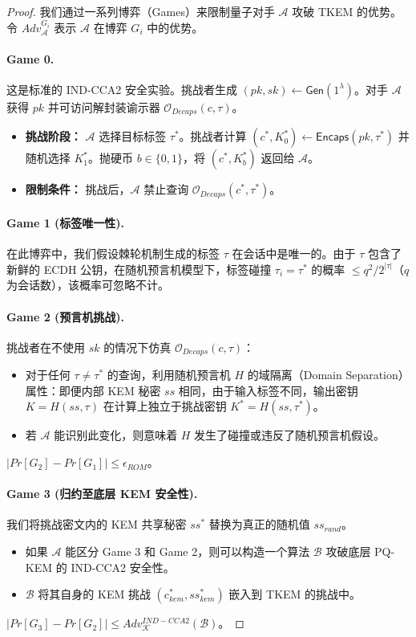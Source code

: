 \begin{proof}
我们通过一系列博弈（Games）来限制量子对手 $\mathcal{A}$ 攻破 TKEM 的优势。令 $Adv_{\mathcal{A}}^{G_i}$ 表示 $\mathcal{A}$ 在博弈 $G_i$ 中的优势。

\paragraph{Game 0.} 这是标准的 IND-CCA2 安全实验。挑战者生成 $(pk, sk) \leftarrow \mathsf{Gen}(1^\lambda)$。对手 $\mathcal{A}$ 获得 $pk$ 并可访问解封装谕示器 $\mathcal{O}_{Decaps}(c, \tau)$。
\begin{itemize}
    \item \textbf{挑战阶段：} $\mathcal{A}$ 选择目标标签 $\tau^*$。挑战者计算 $(c^*, K_0^*) \leftarrow \mathsf{Encaps}(pk, \tau^*)$ 并随机选择 $K_1^*$。抛硬币 $b \in \{0, 1\}$，将 $(c^*, K_b^*)$ 返回给 $\mathcal{A}$。
    \item \textbf{限制条件：} 挑战后，$\mathcal{A}$ 禁止查询 $\mathcal{O}_{Decaps}(c^*, \tau^*)$。
\end{itemize}



\paragraph{Game 1 (标签唯一性).} 在此博弈中，我们假设棘轮机制生成的标签 $\tau$ 在会话中是唯一的。由于 $\tau$ 包含了新鲜的 ECDH 公钥，在随机预言机模型下，标签碰撞 $\tau_i = \tau^*$ 的概率 $\leq q^2 / 2^{|\tau|}$（$q$ 为会话数），该概率可忽略不计。

\paragraph{Game 2 (预言机挑战).} 挑战者在不使用 $sk$ 的情况下仿真 $\mathcal{O}_{Decaps}(c, \tau)$：
\begin{itemize}
    \item 对于任何 $\tau \neq \tau^*$ 的查询，利用随机预言机 $H$ 的域隔离（Domain Separation）属性：即便内部 KEM 秘密 $ss$ 相同，由于输入标签不同，输出密钥 $K = H(ss, \tau)$ 在计算上独立于挑战密钥 $K^* = H(ss, \tau^*)$。
    \item 若 $\mathcal{A}$ 能识别此变化，则意味着 $H$ 发生了碰撞或违反了随机预言机假设。
\end{itemize}
$|Pr[G_2] - Pr[G_1]| \leq \epsilon_{ROM}$。

\paragraph{Game 3 (归约至底层 KEM 安全性).} 我们将挑战密文内的 KEM 共享秘密 $ss^*$ 替换为真正的随机值 $ss_{rand}$。
\begin{itemize}
    \item 如果 $\mathcal{A}$ 能区分 Game 3 和 Game 2，则可以构造一个算法 $\mathcal{B}$ 攻破底层 PQ-KEM 的 IND-CCA2 安全性。
    \item $\mathcal{B}$ 将其自身的 KEM 挑战 $(c_{kem}^*, ss_{kem}^*)$ 嵌入到 TKEM 的挑战中。
\end{itemize}
$|Pr[G_3] - Pr[G_2]| \leq Adv_{\mathcal{K}}^{IND-CCA2}(\mathcal{B})$。




\end{proof}
